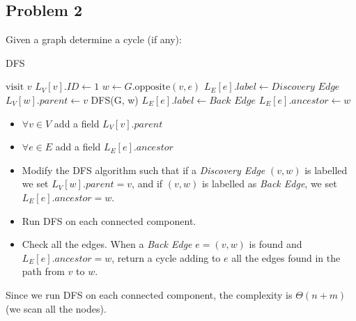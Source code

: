 \vspace{50pt}
\subsection{Problem 2}
Given a graph determine a cycle (if any):
\begin{algorithm}
\caption{DFS}\label{modified_dff_cycles}
    \begin{algorithmic}[1]
    \State $\text{visit } v$
    \State $L_{V}[v].ID \gets 1$
            \State $w \gets G.\text{opposite}(v, e)$
                \State $L_{E}[e].label \gets \textit{Discovery Edge}$
                \State $L_{V}[w].parent \gets v$
                \State DFS(G, w)
            \Else
                \State $L_{E}[e].label \gets \textit{Back Edge}$
                \State $L_{E}[e].ancestor \gets w$
            \EndIf
        \EndIf
    \EndFor
    \EndProcedure
    \end{algorithmic}
\end{algorithm}
\begin{itemize}
    \item $\forall v \in V$ add a field $L_{V}[v].parent$
    \item $\forall e \in E$ add a field $L_{E}[e].ancestor$
    \item Modify the DFS algorithm such that if a \textit{Discovery Edge} $(v,w)$ is labelled we set $L_{V}[w].parent = v$, and if $(v,w)$ is labelled as \textit{Back Edge}, we set $L_{E}[e].ancestor = w$.
    \item Run DFS on each connected component.
    \item Check all the edges. When a \textit{Back Edge} $e = (v, w)$ is found and $L_{E}[e].ancestor = w$, return a cycle adding to $e$ all the edges found in the path from $v$ to $w$. 
\end{itemize}
Since we run DFS on each connected component, the complexity is $\Theta(n + m)$ (we scan all the nodes).

